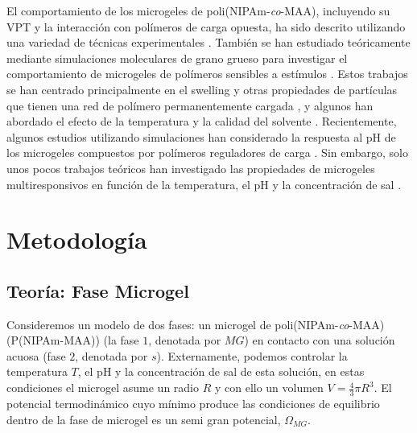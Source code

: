 El comportamiento de los microgeles de poli(NIPAm-\emph{co}-MAA), incluyendo su VPT y la interacci\'on con pol\'imeros de carga opuesta, ha sido descrito utilizando una variedad de t\'ecnicas experimentales \cite{Hoare2004,Dowding2000,Kleinen2008,Kleinen2010,Giussi2015,Su2016,Giussi2020}.
Tambi\'en se han estudiado te\'oricamente mediante simulaciones moleculares de grano grueso para investigar el comportamiento de microgeles de pol\'imeros sensibles a est\'imulos \cite{quesada2011gel,ahualli2016coarse,Landsgesell2019SM}.
Estos trabajos se han centrado principalmente en el swelling y otras propiedades de part\'iculas que tienen una red de pol\'imero permanentemente cargada \cite{Levin2002,Claudio2009,Colla2014,Jha2011,jha2012understanding,QuesadaPerez2013,QuesadaPerez2014,Kobayashi2014,Kobayashi2016,Rizzi2016,moncho-jorda2016a,Kobayashi2017,AdroherBenitez2017PCCP}, y algunos han abordado el efecto de la temperatura y la calidad del solvente \cite{Jha2011,QuesadaPerez2013,QuesadaPerez2014,moncho-jorda2016a,ahualli2016coarse,AdroherBenitez2017PCCP}.
Recientemente, algunos estudios utilizando simulaciones han considerado la respuesta al pH de los microgeles compuestos por pol\'imeros reguladores de carga \cite{Schroeder2015,Rudov2017,Sean2018,Hofzumahaus2018,Lu2019}.
Sin embargo, solo unos pocos trabajos te\'oricos han investigado las propiedades de microgeles multiresponsivos en funci\'on de la temperatura, el pH y la concentraci\'on de sal \cite{CaprilesGonzalez2008,polotsky2013collapse}.


\section{Metodolog\'ia}
\subsection{Teor\'ia: Fase Microgel}\label{sec:gel:theory}


Consideremos un modelo de dos fases: un microgel de poli(NIPAm-\emph{co}-MAA) (P(NIPAm-MAA)) (la fase $1$, denotada por $MG$) en contacto con una soluci\'on acuosa (fase $2$, denotada por $s$).
Externamente, podemos controlar la temperatura $T$, el pH y la concentraci\'on de sal de esta soluci\'on, en estas condiciones el microgel asume un radio $R$ y con ello un volumen $V=\frac{4}{3}\pi R^3$.
El potencial termodin\'amico cuyo m\'inimo produce las condiciones de equilibrio dentro de la fase de microgel es un semi gran potencial, $\Omega_{MG}$.


